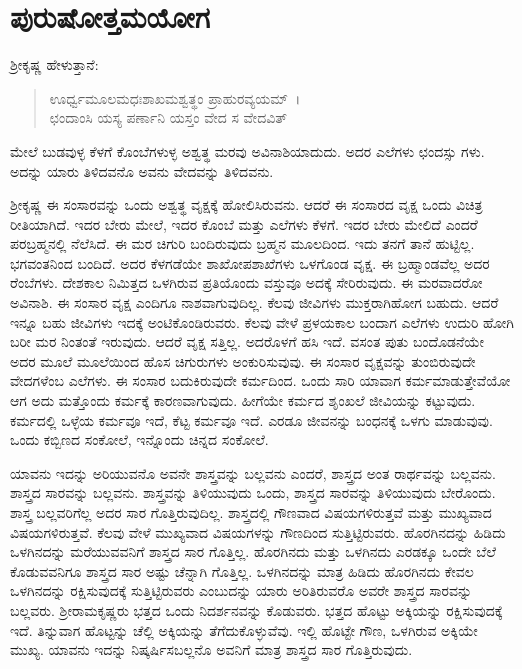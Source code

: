 
\chapter{ಪುರುಷೋತ್ತಮಯೋಗ}

ಶ‍್ರೀಕೃಷ್ಣ ಹೇಳುತ್ತಾನೆ:

\begin{verse}
ಊರ್ಧ್ವಮೂಲಮಧಃಶಾಖಮಶ್ವತ್ಥಂ ಪ್ರಾಹುರವ್ಯಯಮ್~।\\ಛಂದಾಂಸಿ ಯಸ್ಯ ಪರ್ಣಾನಿ ಯಸ್ತಂ ವೇದ ಸ ವೇದವಿತ್ 
\end{verse}

{\small ಮೇಲೆ ಬುಡವುಳ್ಳ ಕೆಳಗೆ ಕೊಂಬೆಗಳುಳ್ಳ ಅಶ್ವತ್ಥ ಮರವು ಅವಿನಾಶಿಯಾದುದು. ಅದರ ಎಲೆಗಳು ಛಂದಸ್ಸು ಗಳು. ಅದನ್ನು ಯಾರು ತಿಳಿದವನೊ ಅವನು ವೇದವನ್ನು ತಿಳಿದವನು.}

ಶ‍್ರೀಕೃಷ್ಣ ಈ ಸಂಸಾರವನ್ನು ಒಂದು ಅಶ್ವತ್ಥ ವೃಕ್ಷಕ್ಕೆ ಹೋಲಿಸಿರುವನು. ಆದರೆ ಈ ಸಂಸಾರದ ವೃಕ್ಷ ಒಂದು ವಿಚಿತ್ರ ರೀತಿಯಾಗಿದೆ. ಇದರ ಬೇರು ಮೇಲೆ, ಇದರ ಕೊಂಬೆ ಮತ್ತು ಎಲೆಗಳು ಕೆಳಗೆ. ಇದರ ಬೇರು ಮೇಲಿದೆ ಎಂದರೆ ಪರಬ್ರಹ್ಮನಲ್ಲಿ ನೆಲೆಸಿದೆ. ಈ ಮರ ಚಿಗುರಿ ಬಂದಿರುವುದು ಬ್ರಹ್ಮನ ಮೂಲದಿಂದ. ಇದು ತನಗೆ ತಾನೆ ಹುಟ್ಟಿಲ್ಲ. ಭಗವಂತನಿಂದ ಬಂದಿದೆ. ಅದರ ಕೆಳಗಡೆಯೇ ಶಾಖೋಪಶಾಖೆಗಳು ಒಳಗೊಂಡ ವೃಕ್ಷ. ಈ ಬ್ರಹ್ಮಾಂಡವೆಲ್ಲ ಅದರ ರೆಂಬೆಗಳು. ದೇಶಕಾಲ ನಿಮಿತ್ತದ ಒಳಗಿರುವ ಪ್ರತಿಯೊಂದು ವಸ್ತುವೂ ಅದಕ್ಕೆ ಸೇರಿರುವುದು. ಈ ಮರವಾದರೋ ಅವಿನಾಶಿ. ಈ ಸಂಸಾರ ವೃಕ್ಷ ಎಂದಿಗೂ ನಾಶವಾಗುವುದಿಲ್ಲ. ಕೆಲವು ಜೀವಿಗಳು ಮುಕ್ತರಾಗಿಹೋಗ ಬಹುದು. ಆದರೆ ಇನ್ನೂ ಬಹು ಜೀವಿಗಳು ಇದಕ್ಕೆ ಅಂಟಿಕೊಂಡಿರುವರು. ಕೆಲವು ವೇಳೆ ಪ್ರಳಯಕಾಲ ಬಂದಾಗ ಎಲೆಗಳು ಉದುರಿ ಹೋಗಿ ಬರೀ ಮರ ನಿಂತಂತೆ ಇರುವುದು. ಆದರೆ ವೃಕ್ಷ ಸತ್ತಿಲ್ಲ. ಅದರೊಳಗೆ ಹಸಿ ಇದೆ. ವಸಂತ ಪುತು ಬಂದೊಡನೆಯೇ ಅದರ ಮೂಲೆ ಮೂಲೆಯಿಂದ ಹೊಸ ಚಿಗುರುಗಳು ಅಂಕುರಿಸುವುವು. ಈ ಸಂಸಾರ ವೃಕ್ಷವನ್ನು ತುಂಬಿರುವುದೇ ವೇದಗಳೆಂಬ ಎಲೆಗಳು. ಈ ಸಂಸಾರ ಬದುಕಿರುವುದೇ ಕರ್ಮದಿಂದ. ಒಂದು ಸಾರಿ ಯಾವಾಗ ಕರ್ಮಮಾಡುತ್ತೇವೆಯೋ ಆಗ ಅದು ಮತ್ತೊಂದು ಕರ್ಮಕ್ಕೆ ಕಾರಣವಾಗುವುದು. ಹೀಗೆಯೇ ಕರ್ಮದ ಶೃಂಖಲೆ ಜೀವಿಯನ್ನು ಕಟ್ಟುವುದು. ಕರ್ಮದಲ್ಲಿ ಒಳ್ಳೆಯ ಕರ್ಮವೂ ಇದೆ, ಕೆಟ್ಟ ಕರ್ಮವೂ ಇದೆ. ಎರಡೂ ಜೀವನನ್ನು ಬಂಧನಕ್ಕೆ ಒಳಗು ಮಾಡುವುವು. ಒಂದು ಕಬ್ಬಿಣದ ಸಂಕೋಲೆ, ಇನ್ನೊಂದು ಚಿನ್ನದ ಸಂಕೋಲೆ.

ಯಾವನು ಇದನ್ನು ಅರಿಯುವನೊ ಅವನೇ ಶಾಸ್ತ್ರವನ್ನು ಬಲ್ಲವನು ಎಂದರೆ, ಶಾಸ್ತ್ರದ ಅಂತ ರಾರ್ಥವನ್ನು ಬಲ್ಲವನು. ಶಾಸ್ತ್ರದ ಸಾರವನ್ನು ಬಲ್ಲವನು. ಶಾಸ್ತ್ರವನ್ನು ತಿಳಿಯುವುದು ಒಂದು, ಶಾಸ್ತ್ರದ ಸಾರವನ್ನು ತಿಳಿಯುವುದು ಬೇರೊಂದು. ಶಾಸ್ತ್ರ ಬಲ್ಲವರಿಗೆಲ್ಲ ಅದರ ಸಾರ ಗೊತ್ತಿರುವುದಿಲ್ಲ. ಶಾಸ್ತ್ರದಲ್ಲಿ ಗೌಣವಾದ ವಿಷಯಗಳಿರುತ್ತವೆ ಮತ್ತು ಮುಖ್ಯವಾದ ವಿಷಯಗಳಿರುತ್ತವೆ. ಕೆಲವು ವೇಳೆ ಮುಖ್ಯವಾದ ವಿಷಯಗಳನ್ನು ಗೌಣದಿಂದ ಸುತ್ತಿಟ್ಟಿರುವರು. ಹೊರಗಿನದನ್ನು ಹಿಡಿದು ಒಳಗಿನದನ್ನು ಮರೆಯುವವನಿಗೆ ಶಾಸ್ತ್ರದ ಸಾರ ಗೊತ್ತಿಲ್ಲ. ಹೊರಗಿನದು ಮತ್ತು ಒಳಗಿನದು ಎರಡಕ್ಕೂ ಒಂದೇ ಬೆಲೆ ಕೊಡುವವನಿಗೂ ಶಾಸ್ತ್ರದ ಸಾರ ಅಷ್ಟು ಚೆನ್ನಾಗಿ ಗೊತ್ತಿಲ್ಲ. ಒಳಗಿನದನ್ನು ಮಾತ್ರ ಹಿಡಿದು ಹೊರಗಿನದು ಕೇವಲ ಒಳಗಿನದನ್ನು ರಕ್ಷಿಸುವುದಕ್ಕೆ ಸುತ್ತಿಟ್ಟಿರುವರು ಎಂಬುದನ್ನು ಯಾರು ಅರಿತಿರುವರೊ ಅವರೇ ಶಾಸ್ತ್ರದ ಸಾರವನ್ನು ಬಲ್ಲವರು. ಶ‍್ರೀರಾಮಕೃಷ್ಣರು ಭತ್ತದ ಒಂದು ನಿದರ್ಶನವನ್ನು ಕೊಡುವರು. ಭತ್ತದ ಹೊಟ್ಟು ಅಕ್ಕಿಯನ್ನು ರಕ್ಷಿಸುವುದಕ್ಕೆ ಇದೆ. ತಿನ್ನುವಾಗ ಹೊಟ್ಟನ್ನು ಚೆಲ್ಲಿ ಅಕ್ಕಿಯನ್ನು ತೆಗೆದುಕೊಳ್ಳುವೆವು. ಇಲ್ಲಿ ಹೊಟ್ಟೇ ಗೌಣ, ಒಳಗಿರುವ ಅಕ್ಕಿಯೇ ಮುಖ್ಯ. ಯಾವನು ಇದನ್ನು ನಿಷ್ಕರ್ಷಿಸಬಲ್ಲನೊ ಅವನಿಗೆ ಮಾತ್ರ ಶಾಸ್ತ್ರದ ಸಾರ ಗೊತ್ತಿರುವುದು.

